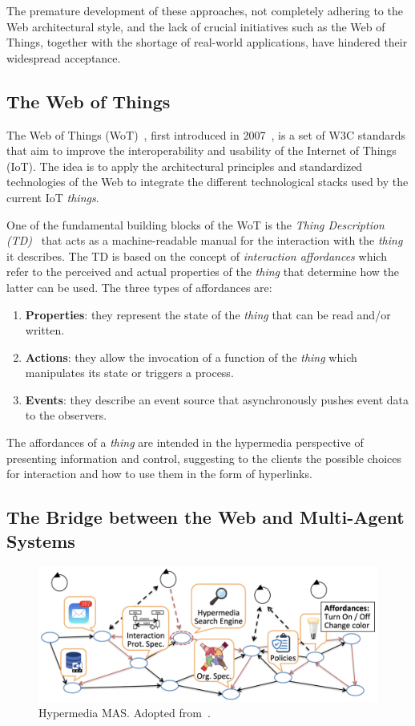 The premature development of these approaches, not completely adhering to the Web architectural style, and the lack of crucial initiatives such as the Web of Things, together with the shortage of real-world applications, have hindered their widespread acceptance.

\subsection{The Web of Things}
The Web of Things (WoT)~\cite{wot}, first introduced in 2007~\cite{guinard2011web}, is a set of W3C standards that aim to improve the interoperability and usability of the Internet of Things (IoT).
The idea is to apply the architectural principles and standardized technologies of the Web to integrate the different technological stacks used by the current IoT \textit{things}.

One of the fundamental building blocks of the WoT is the \textit{Thing Description (TD)}~\cite{wottd} that acts as a machine-readable manual for the interaction with the \textit{thing} it describes.
The TD is based on the concept of \textit{interaction affordances} which refer to the perceived and actual properties of the \textit{thing} that determine how the latter can be used.
The three types of affordances are:
\begin{enumerate}
    \item \textbf{Properties}: they represent the state of the \textit{thing} that can be read and/or written.
    \item \textbf{Actions}: they allow the invocation of a function of the \textit{thing} which manipulates its state or triggers a process.
    \item \textbf{Events}: they describe an event source that asynchronously pushes event data to the observers.
\end{enumerate}
The affordances of a \textit{thing} are intended in the hypermedia perspective of presenting information and control, suggesting to the clients the possible choices for interaction and how to use them in the form of hyperlinks.

\subsection{The Bridge between the Web and Multi-Agent Systems}

\begin{figure}
    \centering
    \includegraphics[width=\linewidth]{images/hypermedia-mas.png}
    \caption{Hypermedia MAS. Adopted from~\cite{ciortea2019}.}
    \label{fig:hypermedia-mas}
\end{figure}


